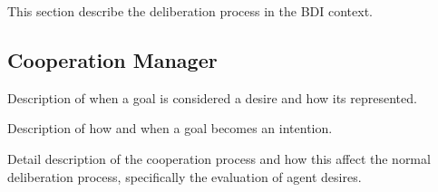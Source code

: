 This section describe the deliberation process in the BDI context.
\subsection{Cooperation Manager}
Description of when a goal is considered a desire and how its represented.

Description of how and when a goal becomes an intention.

Detail description of the cooperation process and how this affect the normal deliberation process, specifically the evaluation of agent desires.
